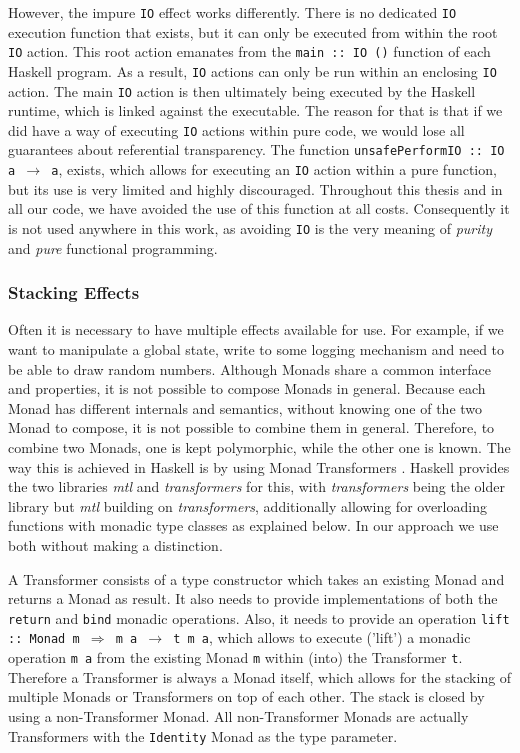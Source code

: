 However, the impure \texttt{IO} effect works differently. There is no dedicated \texttt{IO} execution function that exists, but it can only be executed from within the root \texttt{IO} action. This root action emanates from the \texttt{main :: IO ()} function of each Haskell program. As a result, \texttt{IO} actions can only be run within an enclosing \texttt{IO} action. The main \texttt{IO} action is then ultimately being executed by the Haskell runtime, which is linked against the executable. The reason for that is that if we did have a way of executing \texttt{IO} actions within pure code, we would lose all guarantees about referential transparency. The function \texttt{unsafePerformIO :: IO a $\rightarrow$ a}, exists, which allows for executing an \texttt{IO} action within a pure function, but its use is very limited and highly discouraged. Throughout this thesis and in all our code, we have avoided the use of this function at all costs. Consequently it is not used anywhere in this work, as avoiding \texttt{IO} is the very meaning of \textit{purity} and \textit{pure} functional programming.

\subsubsection{Stacking Effects}
\label{sec:back_transformers}
Often it is necessary to have multiple effects available for use. For example, if we want to manipulate a global state, write to some logging mechanism and need to be able to draw random numbers. Although Monads share a common interface and properties, it is not possible to compose Monads in general. Because each Monad has different internals and semantics, without knowing one of the two Monad to compose, it is not possible to combine them in general. Therefore, to combine two Monads, one is kept polymorphic, while the other one is known. The way this is achieved in Haskell is by using Monad Transformers \cite{allen_haskell_2016, jones_functional_1995, jones_tackling_2002}. Haskell provides the two libraries \textit{mtl} and \textit{transformers} for this, with \textit{transformers} being the older library but \textit{mtl} building on \textit{transformers}, additionally allowing for overloading functions with monadic type classes as explained below. In our approach we use both without making a distinction.

A Transformer consists of a type constructor which takes an existing Monad and returns a Monad as result. It also needs to provide implementations of both the \texttt{return} and \texttt{bind} monadic operations. Also, it needs to provide an operation \texttt{lift :: Monad m $\Rightarrow$ m a $\rightarrow$ t m a}, which allows to execute ('lift') a monadic operation \texttt{m a} from the existing Monad \texttt{m} within (into) the Transformer \texttt{t}. Therefore a Transformer is always a Monad itself, which allows for the stacking of multiple Monads or Transformers on top of each other. The stack is closed by using a non-Transformer Monad. All non-Transformer Monads are actually Transformers with the \texttt{Identity} Monad as the type parameter.

